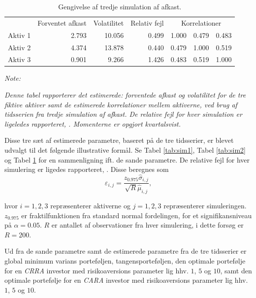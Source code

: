 \documentclass[
  a4paper,
  oneside]{memoir}
\begin{document}
\begin{table}[!h]

\caption{\label{tab:sim3}Gengivelse af tredje simulation af afkast.}
\centering
\begin{threeparttable}
\begin{tabular}[t]{lrrrrrr}
\toprule
\multicolumn{1}{c}{ } & \multicolumn{1}{c}{Forventet afkast} & \multicolumn{1}{c}{Volatilitet} & \multicolumn{1}{c}{Relativ fejl} & \multicolumn{3}{c}{Korrelationer} \\
\cmidrule(l{3pt}r{3pt}){2-2} \cmidrule(l{3pt}r{3pt}){3-3} \cmidrule(l{3pt}r{3pt}){4-4} \cmidrule(l{3pt}r{3pt}){5-7}
\rowcolor{gray!6}  Aktiv 1 & 2.793 & 10.056 & 0.499 & 1.000 & 0.479 & 0.483\\
Aktiv 2 & 4.374 & 13.878 & 0.440 & 0.479 & 1.000 & 0.519\\
\rowcolor{gray!6}  Aktiv 3 & 0.901 & 9.266 & 1.426 & 0.483 & 0.519 & 1.000\\
\bottomrule
\end{tabular}
\begin{tablenotes}
\item \textit{Note: } 
\item \textit{Denne tabel rapporterer det estimerede: forventede afkast og volatilitet for de tre fiktive aktiver samt de estimerede korrelationer mellem aktiverne, ved brug af tidsserien fra tredje simulation af afkast. De relative fejl for hver simulation er ligeledes rapporteret, \citep{Asmussen2007}. Momenterne er opgjort kvartalsvist.}
\end{tablenotes}
\end{threeparttable}
\end{table}

Disse tre sæt af estimerede parametre, baseret på de tre tidsserier, er blevet udvalgt til det følgende illustrative formål. Se Tabel \ref{tab:sim1}, Tabel \ref{tab:sim2} og Tabel \ref{tab:sim3} for en sammenligning ift. de sande parametre. De relative fejl for hver simulering er ligedes rapporteret, \citep{Asmussen2007}. Disse beregnes som
\[\varepsilon_{i,j} = \frac{z_{0.975}\hat{\sigma}_{i,j}}{\sqrt{R}\hat{\mu}_{i,j}},\]

hvor \(i=1,2,3\) repræsenterer aktiverne og \(j=1,2,3\) repræsenterer simuleringen. \(z_{0.975}\) er fraktilfunktionen fra standard normal fordelingen, for et signifikansniveau på \(\alpha=0.05\). \(R\) er antallet af observationer fra hver simulering, i dette forsøg er \(R=200\).

Ud fra de sande parametre samt de estimerede parametre fra de tre tidsserier er global minimum varians porteføljen, tangensporteføljen, den optimale portefølje for en \emph{CRRA} investor med risikoaversions parameter lig hhv. \(1\), \(5\) og \(10\), samt den optimale portefølje for en \emph{CARA} investor med risikoaversions parameter lig hhv. \(1\), \(5\) og \(10\).
\end{document}
